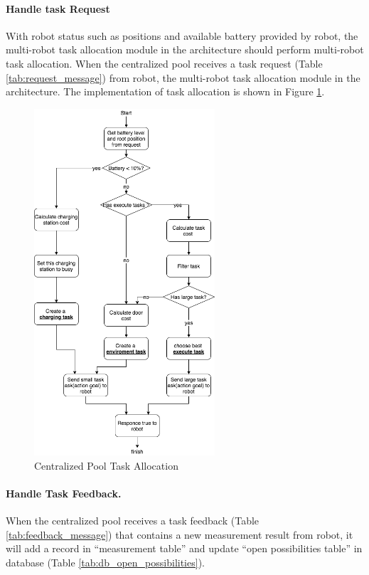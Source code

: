\paragraph{Handle task Request}
With robot status such as positions and available battery provided by robot, the multi-robot task allocation module in the architecture should perform multi-robot task allocation. 
When the centralized pool receives a task request (Table \ref{tab:request_message}) from robot,  the multi-robot task allocation module in the architecture. The implementation of task allocation is shown in Figure \ref{fig:centralized_task_allocation}. 

\begin{figure}[htbp]
    \centering
    \includegraphics[width = 0.6\textwidth]{content/images/ch4/centralized_task_select.drawio.png}
    \caption{Centralized Pool Task Allocation}
    \label{fig:centralized_task_allocation}
\end{figure}

\paragraph{Handle Task Feedback.}
When the centralized pool receives a task feedback (Table \ref{tab:feedback_message}) that contains a new measurement result from robot, it will add a record in ``measurement table'' and update ``open possibilities table'' in database (Table \ref{tab:db_open_possibilities}).

